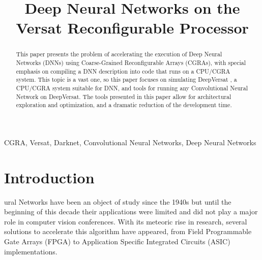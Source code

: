 \documentclass[conference]{IEEEtran}
\begin{document}
\lstset{language=C++}
\lstset{basicstyle=\scriptsize}
	


\title{Deep Neural Networks on the Versat Reconfigurable Processor\\ }

\author{
}

\maketitle

\begin{abstract}
This paper presents the problem of accelerating the execution of Deep Neural
Networks (DNNs) using Coarse-Grained Reconfigurable Arrays (CGRAs), 
with special emphasis on compiling a DNN description into code that runs on a
CPU/CGRA system. This topic is a vast one, so this paper focuses on simulating
DeepVersat , a CPU/CGRA system suitable for DNN, and tools for running any
Convolutional Neural Network on DeepVersat. The tools presented in this paper
allow for architectural exploration and optimization, and a dramatic reduction
of the development time.
\end{abstract}

\begin{IEEEkeywords}
CGRA, Versat, Darknet, Convolutional Neural Networks, Deep Neural Networks
\end{IEEEkeywords}


\section{Introduction}
ural Networks have been an object of study since the 1940s but until the
beginning of this decade their applications were limited and did not play a
major role in computer vision conferences. With its meteoric rise in research,
several solutions to accelerate this algorithm have appeared, from Field Programmable Gate Arrays (FPGA) to
Application Specific Integrated Circuits (ASIC) implementations.
\end{document}
